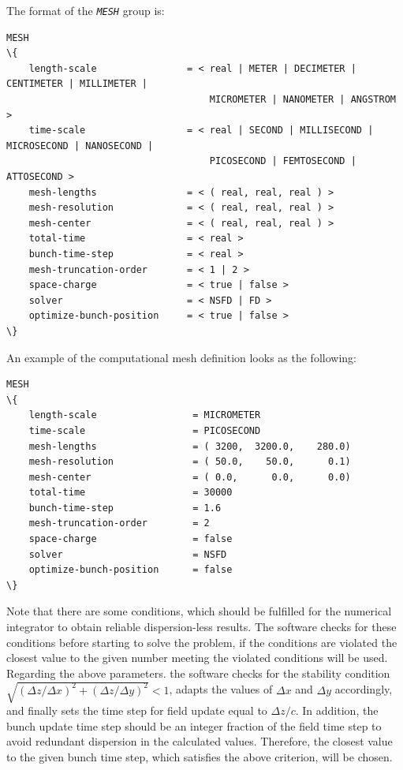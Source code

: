 The format of the {\tt \em \small MESH} group is:
%
\begin{Verbatim}[frame=single, fontsize=\small, tabsize=4, fontfamily=courier, fontseries=b, commandchars=\\\{\}, obeytabs]
MESH
\{
	length-scale				= < real | METER | DECIMETER | CENTIMETER | MILLIMETER | 
									MICROMETER | NANOMETER | ANGSTROM >
	time-scale					= < real | SECOND | MILLISECOND | MICROSECOND | NANOSECOND | 
									PICOSECOND | FEMTOSECOND |	ATTOSECOND >
	mesh-lengths				= < ( real, real, real ) >
	mesh-resolution		 		= < ( real, real, real ) >
	mesh-center				 	= < ( real, real, real ) >
	total-time					= < real >
	bunch-time-step		 		= < real >
	mesh-truncation-order 		= < 1 | 2 >
	space-charge  				= < true | false >
	solver						= < NSFD | FD >
	optimize-bunch-position		= < true | false >
\}
\end{Verbatim}
An example of the computational mesh definition looks as the following:
\begin{snugshade}
\begin{Verbatim}[fontsize=\small, tabsize=4, fontfamily=courier, fontseries=b, commandchars=\\\{\}, obeytabs]
MESH
\{
	length-scale 				 = MICROMETER
	time-scale					 = PICOSECOND
	mesh-lengths				 = ( 3200,  3200.0,    280.0)
	mesh-resolution				 = ( 50.0,    50.0,      0.1)
	mesh-center					 = ( 0.0,      0.0,      0.0)
	total-time 					 = 30000
	bunch-time-step				 = 1.6
	mesh-truncation-order		 = 2
	space-charge				 = false
	solver						 = NSFD
	optimize-bunch-position		 = false
\}
\end{Verbatim}
\end{snugshade}
%
Note that there are some conditions, which should be fulfilled for the numerical integrator to obtain reliable dispersion-less results.
%
The software checks for these conditions before starting to solve the problem, if the conditions are violated the closest value to the given number meeting the violated conditions will be used.
%
Regarding the above parameters. the software checks for the stability condition $\sqrt{(\Delta z/\Delta x)^2+ (\Delta z/\Delta y)^2} < 1$, adapts the values of $\Delta x$ and $\Delta y$ accordingly, and finally sets the time step for field update equal to $\Delta z / c$.
%
In addition, the bunch update time step should be an integer fraction of the field time step to avoid redundant dispersion in the calculated values.
%
Therefore, the closest value to the given bunch time step, which satisfies the above criterion, will be chosen.


